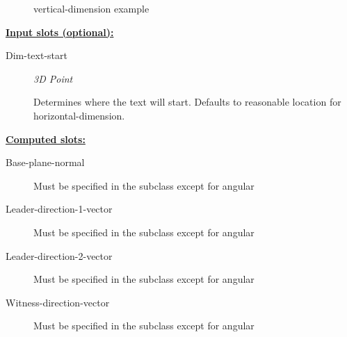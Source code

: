 \documentclass [11pt]{book}
\begin{document}
\begin{itemize}
\begin{figure}
\caption{vertical-dimension example}

\label{fig:vertical-dimension}

\end{figure}





\textbf{
\underline{Input slots (optional):}}

\begin{description}

\item [Dim-text-start]
\emph{3D Point}

 Determines where the text will start. Defaults to reasonable location for
horizontal-dimension.




\end{description}






\textbf{
\underline{Computed slots:}}

\begin{description}

\item [Base-plane-normal]

Must be specified in the subclass except for angular




\item [Leader-direction-1-vector]

Must be specified in the subclass except for angular




\item [Leader-direction-2-vector]

Must be specified in the subclass except for angular




\item [Witness-direction-vector]

Must be specified in the subclass except for angular




\end{description}







\end{itemize}
\end{document}
